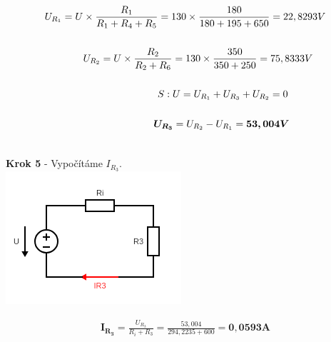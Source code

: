 \begin{gather*}
\newline
U_{R_1} = U \times \frac{R_1}{R_1 + R_4 + R_5} = 130 \times \frac{180}{180 + 195 + 650} = 22,8293 V \\\\
\newline
\newline
U_{R_2} = U \times \frac{R_2}{R_2 + R_6} = 130 \times \frac{350}{350 + 250} = 75,8333 V \\\\
\newline
\newline
S: U = U_{R_1} + U_{R_3} + U_{R_2} = 0\\\\
\newline
\newline
\boldsymbol{U_{R_3}} = U_{R_2} - U_{R_1} = \boldsymbol{53,004 V} \\\\
\end{gather*}

\begin{center}
\textbf{Krok 5} - Vypočítáme  $I_{R_3}$. \\
\includegraphics[scale=1,keepaspectratio]{fig/Pr2_steps/Pr2_step05.png}
\end{center}
\vspace{-0.3cm}

\begin{gather*}
\boldsymbol{I_{R_3}} = \frac{U_{R_3}}{R_i + R_3} = \frac{53,004}{294,2235 + 600} = \boldsymbol{0,0593 A} \\\\
\end{gather*}